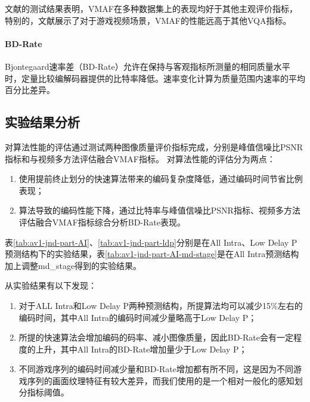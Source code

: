 	文献\cite{liPracticalPerceptualVideo,barmanEvaluationVideoQuality2018a, leeComparisonObjectiveQuality2017}的测试结果表明，VMAF在多种数据集上的表现均好于其他主观评价指标，特别的，文献\cite{barmanEvaluationVideoQuality2018a}展示了对于游戏视频场景，VMAF的性能远高于其他VQA指标。

	\paragraph{BD-Rate} Bjontegaard速率差\cite{Bjontegaard2001CalculationOA}（BD-Rate）允许在保持与客观指标所测量的相同质量水平时，定量比较编解码器提供的比特率降低。速率变化计算为质量范围内速率的平均百分比差异。

  \subsection{实验结果分析}

  对算法性能的评估通过测试两种图像质量评价指标完成，分别是峰值信噪比PSNR指标和与视频多方法评估融合VMAF指标。
  对算法性能的评估分为两点：

  \begin{enumerate}[label=\arabic*)]
    \item 使用提前终止划分的快速算法带来的编码复杂度降低，通过编码时间节省比例表现；
    \item 算法导致的编码性能下降，通过比特率与峰值信噪比PSNR指标、视频多方法评估融合VMAF指标综合分析BD-Rate表现。
  \end{enumerate}

  表\ref{tab:av1-jnd-part-AI}、\ref{tab:av1-jnd-part-ldp}分别是在All Intra、Low Delay P预测结构下的实验结果，表\ref{tab:av1-jnd-part-AI-md-stage}是在All Intra预测结构加上调整md\_stage得到的实验结果。

  从实验结果有以下发现：

  \begin{enumerate}[label=\arabic*)]
    \item 对于ALL Intra和Low Delay P两种预测结构，所提算法均可以减少15\%左右的编码时间，其中All Intra的编码时间减少量略高于Low Delay P；
    \item 所提的快速算法会增加编码的码率、减小图像质量，因此BD-Rate会有一定程度的上升，其中All Intra的BD-Rate增加量少于Low Delay P；
    \item 不同游戏序列的编码时间减少量和BD-Rate增加都有所不同，这是因为不同游戏序列的画面纹理特征有较大差异，而我们使用的是一个相对一般化的感知划分指标阈值。
  \end{enumerate}

